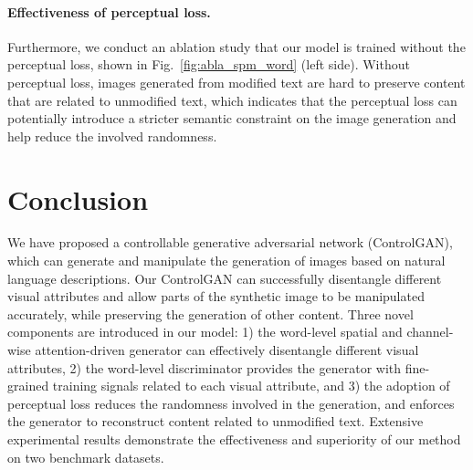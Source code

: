 \paragraph{Effectiveness of perceptual loss.} Furthermore, we conduct an ablation study that our model is trained without the perceptual loss, shown in Fig.~\ref{fig:abla_spm_word} (left side). Without perceptual loss, images generated from modified text are hard to preserve content that are related to unmodified text, which indicates that the perceptual loss can potentially introduce a stricter semantic constraint on the image generation and help reduce the involved randomness. 

\section{Conclusion}
We have proposed a controllable generative adversarial network (ControlGAN), which can generate and manipulate the generation of images based on natural language descriptions. Our ControlGAN can successfully disentangle different visual attributes and allow parts of the synthetic image to be manipulated accurately, while preserving the generation of other content. Three novel components are introduced in our model: 1) the word-level spatial and channel-wise attention-driven generator can effectively disentangle different visual attributes, 2) the word-level discriminator provides the generator with fine-grained training signals related to each visual attribute, and 3) the adoption of perceptual loss reduces the randomness involved in the generation, and enforces the generator to reconstruct content related to unmodified text. Extensive experimental results demonstrate the effectiveness and superiority of our method on two benchmark datasets.


